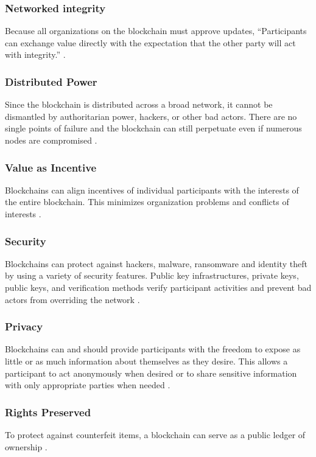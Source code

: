 \documentclass[sigconf]{acmart}
\begin{document}
\subsubsection{Networked integrity} Because all organizations on the blockchain must approve updates, ``Participants can exchange value directly with the expectation that the other party will act with integrity.'' \cite{tapscott}. 

\subsubsection{Distributed Power} Since the blockchain is distributed across a broad network, it cannot be dismantled by authoritarian power, hackers, or other bad actors. There are no single points of failure and the blockchain can still perpetuate even if numerous nodes are compromised \cite{tapscott}.

\subsubsection{Value as Incentive} Blockchains can align incentives of individual participants with the interests of the entire blockchain. This minimizes organization problems and conflicts of interests \cite{tapscott}.

\subsubsection{Security} Blockchains can protect against hackers, malware, ransomware and identity theft by using a variety of security features. Public key infrastructures, private keys, public keys, and verification methods verify participant activities and prevent bad actors from overriding the network \cite{tapscott}. 

\subsubsection{Privacy} Blockchains can and should provide participants with the freedom to expose as little or as much information about themselves as they desire. This allows a participant to act anonymously when desired or to share sensitive information with only appropriate parties when needed \cite{tapscott}.

\subsubsection{Rights Preserved} To protect against counterfeit items, a blockchain can serve as a public ledger of ownership \cite{tapscott}.
\end{document}
